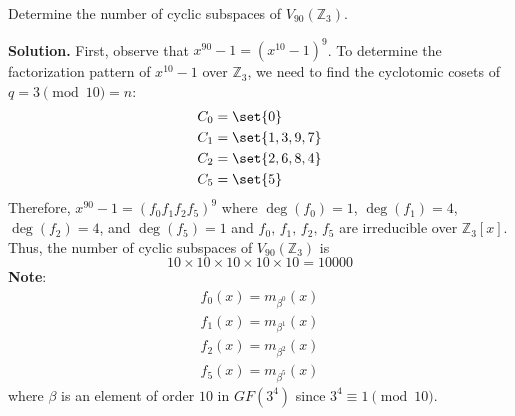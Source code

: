 \begin{Example}{}{}
    Determine the number of cyclic subspaces of $ V_{90}(\mathbb{Z}_3) $.

    \textbf{Solution.} First, observe that $ x^{90}-1=(x^{10}-1)^9 $.
    To determine the factorization pattern of $ x^{10}-1 $
    over $ \mathbb{Z}_3 $, we need to find the cyclotomic cosets
    of $ q=3\pmod{10}=n $:
    \begin{align*}
        C_0 & =\set{0}       \\
        C_1 & =\set{1,3,9,7} \\
        C_2 & =\set{2,6,8,4} \\
        C_5 & =\set{5}
    \end{align*}
    Therefore, $ x^{90}-1=(f_0f_1f_2f_5)^9 $ where
    $ \deg(f_0)=1 $, $ \deg(f_1)=4 $, $ \deg(f_2)=4 $, and $ \deg(f_5)=1 $
    and $ f_0,\,f_1,\,f_2,\,f_5 $ are irreducible over $ \mathbb{Z}_3[x] $.
    Thus, the number of cyclic subspaces of $ V_{90}(\mathbb{Z}_3) $
    is
    \[ 10\times 10\times 10\times 10\times 10=10 000 \]
    \textbf{Note}:
    \begin{align*}
        f_0(x)=m_{\beta^0}(x) \\
        f_1(x)=m_{\beta^1}(x) \\
        f_2(x)=m_{\beta^2}(x) \\
        f_5(x)=m_{\beta^5}(x)
    \end{align*}
    where $ \beta $ is an element of order $ 10 $ in $ GF(3^4) $
    since $ 3^4\equiv 1\pmod{10} $.
\end{Example}

